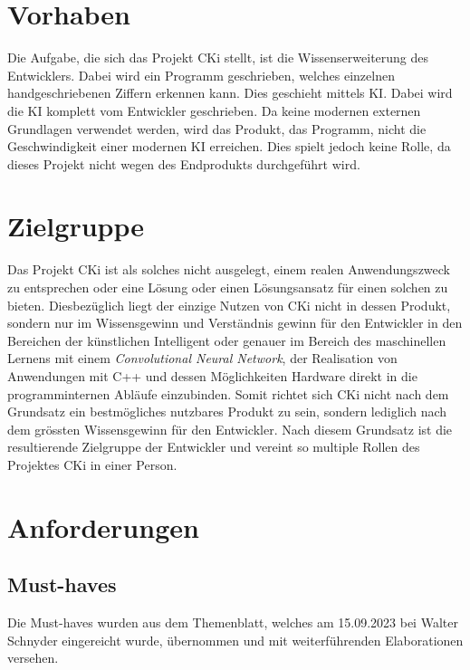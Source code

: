 \section{Vorhaben}
\label{sec:AnalyseAufgabenstellung}
Die Aufgabe, die sich das Projekt CKi stellt, ist die Wissenserweiterung des Entwicklers. Dabei wird ein Programm geschrieben, welches einzelnen handgeschriebenen Ziffern erkennen kann. Dies geschieht mittels KI. Dabei wird die KI komplett vom Entwickler geschrieben. Da keine modernen externen Grundlagen verwendet werden, wird das Produkt, das Programm, nicht die Geschwindigkeit einer modernen KI erreichen. Dies spielt jedoch keine Rolle, da dieses Projekt nicht wegen des Endprodukts durchgeführt wird.

\section{Zielgruppe}
\label{sec:AnalyseZielgruppe}
Das Projekt CKi ist als solches nicht ausgelegt, einem realen Anwendungszweck zu entsprechen oder eine Lösung oder einen Lösungsansatz für einen solchen zu bieten. Diesbezüglich liegt der einzige Nutzen von CKi nicht in dessen Produkt, sondern nur im Wissensgewinn und Verständnis gewinn für den Entwickler in den Bereichen der künstlichen Intelligent oder genauer im Bereich des maschinellen Lernens mit einem \textit{Convolutional Neural Network}, der Realisation von Anwendungen mit C++ und dessen Möglichkeiten Hardware direkt in die programminternen Abläufe einzubinden. Somit richtet sich CKi nicht nach dem Grundsatz ein bestmögliches nutzbares Produkt zu sein, sondern lediglich nach dem grössten Wissensgewinn für den Entwickler. Nach diesem Grundsatz ist die resultierende Zielgruppe der Entwickler und vereint so multiple Rollen des Projektes CKi in einer Person.

\section{Anforderungen}
\label{sec:AnalyseAnforderungen}

\subsection{Must-haves}
\label{sec:AnalyseMustHaveS}
Die Must-haves wurden aus dem Themenblatt, welches am 15.09.2023 bei Walter Schnyder eingereicht wurde, übernommen und mit weiterführenden Elaborationen versehen.

